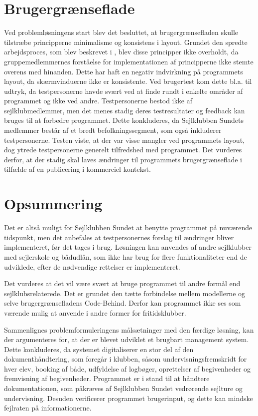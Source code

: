 \section*{Brugergrænseflade}

Ved problemløsningens start blev det besluttet, at brugergrænsefladen skulle tilstræbe principperne minimalisme og konsistens i layout.
Grundet den spredte arbejdsproces, som blev beskrevet i , blev disse principper ikke overholdt, da gruppemedlemmernes forståelse for implementationen af principperne ikke stemte overens med hinanden.
Dette har haft en negativ indvirkning på programmets layout, da skærmvinduerne ikke er konsistente.
Ved brugertest kom dette bl.a. til udtryk, da testpersonerne havde svært ved at finde rundt i enkelte områder af programmet og ikke ved andre. 
Testpersonerne bestod ikke af sejlklubmedlemmer, men det menes stadig deres testresultater og feedback kan bruges til at forbedre programmet.
Dette konkluderes, da Sejlklubben Sundets medlemmer består af et bredt befolkningssegment, som også inkluderer testpersonerne. 
Testen viste, at der var visse mangler ved programmets layout, dog ytrede testpersonerne generelt tilfredshed med programmet.
Det vurderes derfor, at der stadig skal laves ændringer til programmets brugergrænseflade i tilfælde af en publicering i kommerciel kontekst. 


\section*{Opsummering}

Det er altså muligt for Sejlklubben Sundet at benytte programmet på nuværende tidspunkt, men det anbefales at testpersonernes forslag til ændringer bliver implementeret, før det tages i brug.
Løsningen kan anvendes af andre sejlklubber med sejlerskole og bådudlån, som ikke har brug for flere funktionaliteter end de udviklede, efter de nødvendige rettelser er implementeret. 

Det vurderes at det vil være svært at bruge programmet til andre formål end sejlklubsrelaterede. 
Det er grundet den tætte forbindelse mellem modellerne og selve brugergrænsefladens Code-Behind. 
Derfor kan programmet ikke ses som værende mulig at anvende i andre former for fritidsklubber. 

Sammenlignes problemformuleringens målsætninger med den færdige løsning, kan der argumenteres for, at der er blevet udviklet et brugbart management system. 
Dette konkluderes, da systemet digitaliserer en stor del af den dokumenthåndtering, som foregår i klubben, såsom undervisningsfremskridt for hver elev, booking af både, udfyldelse af logbøger, oprettelser af begivenheder og fremvisning af begivenheder.
Programmet er i stand til at håndtere dokumentationen, som påkræves af Sejlklubben Sundet vedrørende sejlture og undervisning.
Desuden verificerer programmet brugerinput, og dette kan mindske fejlraten på informationerne.